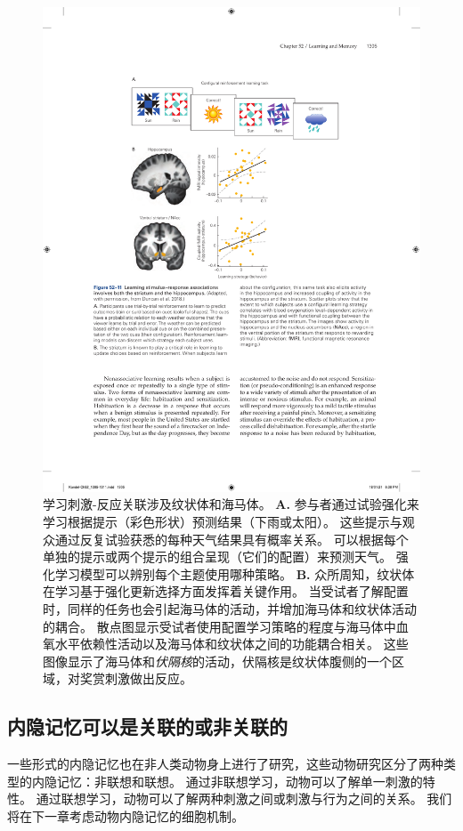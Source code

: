 \begin{figure}[htbp]
	\centering
	\includegraphics[width=0.75\linewidth]{chap52/fig_52_11}
	\caption{学习刺激-反应关联涉及纹状体和海马体\cite{duncan2018more}。
		\textbf{A.} 参与者通过试验强化来学习根据提示（彩色形状）预测结果（下雨或太阳）。
		这些提示与观众通过反复试验获悉的每种天气结果具有概率关系。
		可以根据每个单独的提示或两个提示的组合呈现（它们的配置）来预测天气。
		强化学习模型可以辨别每个主题使用哪种策略。
		\textbf{B.} 众所周知，纹状体在学习基于强化更新选择方面发挥着关键作用。
		当受试者了解配置时，同样的任务也会引起海马体的活动，并增加海马体和纹状体活动的耦合。
		散点图显示受试者使用配置学习策略的程度与海马体中血氧水平依赖性活动以及海马体和纹状体之间的功能耦合相关。
		这些图像显示了海马体和\textit{伏隔核}的活动，伏隔核是纹状体腹侧的一个区域，对奖赏刺激做出反应。}
	\label{fig:52_11}
\end{figure}



\subsection{内隐记忆可以是关联的或非关联的}

一些形式的内隐记忆也在非人类动物身上进行了研究，这些动物研究区分了两种类型的内隐记忆：非联想和联想。
通过非联想学习，动物可以了解单一刺激的特性。
通过联想学习，动物可以了解两种刺激之间或刺激与行为之间的关系。
我们将在下一章考虑动物内隐记忆的细胞机制。



